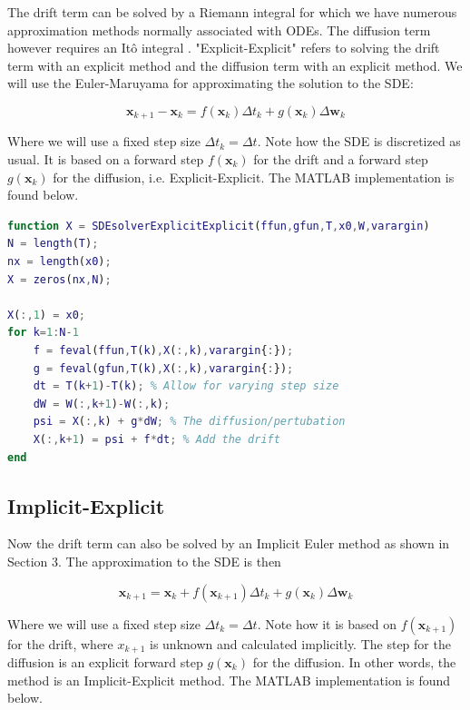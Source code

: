 The drift term can be solved by a Riemann integral for which we have numerous approximation methods normally associated with ODEs. The diffusion term however requires an Itô integral \cite{JrgensenScientificEquationsd}. "Explicit-Explicit" refers to solving the drift term with an explicit method and the diffusion term with an explicit method. We will use the Euler-Maruyama for approximating the solution to the SDE:

\begin{equation}
\boldsymbol{x}_{k+1}-\boldsymbol{x}_{k}=f\left(\boldsymbol{x}_{k}\right) \Delta t_{k}+g\left(\boldsymbol{x}_{k}\right) \Delta \boldsymbol{w}_{k}
\end{equation}

Where we will use a fixed step size $\Delta t_k = \Delta t$. Note how the SDE is discretized as usual. It is based on a forward step $f\left(\boldsymbol{x}_{k}\right)$ for the drift and a forward step $g\left(\boldsymbol{x}_{k}\right)$ for the diffusion, i.e. Explicit-Explicit. The MATLAB implementation is found below.

\begin{adjustwidth*}{0cm}{-0.4cm}
\begin{lstlisting}[frame=single, language=Matlab,caption=Euler-Maruyama, label=hnrkmdsen]
function X = SDEsolverExplicitExplicit(ffun,gfun,T,x0,W,varargin)
N = length(T);
nx = length(x0);
X = zeros(nx,N);

X(:,1) = x0;
for k=1:N-1
    f = feval(ffun,T(k),X(:,k),varargin{:});
    g = feval(gfun,T(k),X(:,k),varargin{:});
    dt = T(k+1)-T(k); % Allow for varying step size
    dW = W(:,k+1)-W(:,k);
    psi = X(:,k) + g*dW; % The diffusion/pertubation 
    X(:,k+1) = psi + f*dt; % Add the drift
end
\end{lstlisting}
\end{adjustwidth*}

\subsection{Implicit-Explicit}
Now the drift term can also be solved by an Implicit Euler method as shown in Section 3. The approximation to the SDE is then

\begin{equation}
\boldsymbol{x}_{k+1}=\boldsymbol{x}_{k}+f\left(\boldsymbol{x}_{k+1}\right) \Delta t_{k}+g\left(\boldsymbol{x}_{k}\right) \Delta \boldsymbol{w}_{k}
\end{equation}

Where we will use a fixed step size $\Delta t_k = \Delta t$. Note how it is based on $f\left(\boldsymbol{x}_{k+1}\right)$ for the drift, where $x_{k+1}$ is unknown and calculated implicitly. The step for the diffusion is an explicit forward step $g\left(\boldsymbol{x}_{k}\right)$ for the diffusion. In other words, the method is an Implicit-Explicit method. The MATLAB implementation is found below.

